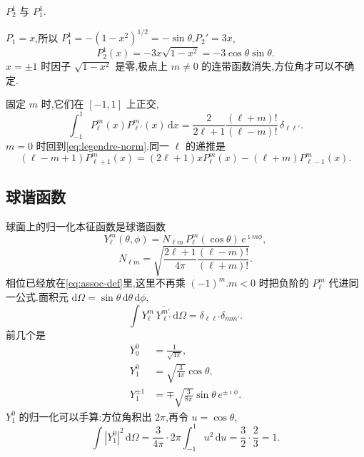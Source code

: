 \begin{example}
$P_2^{1}$ 与 $P_1^{1}$.
\end{example}
\begin{solution}
$P_1=x$,所以 $P_1^{1}=-(1-x^2)^{1/2}=-\sin\theta$.$P_2' =3x$,
\begin{equation}
  P_2^{1}(x)=-3x\sqrt{1-x^2}=-3\cos\theta\sin\theta.
\end{equation}
$x=\pm 1$ 时因子 $\sqrt{1-x^2}$ 是零,极点上 $m\neq 0$ 的连带函数消失,方位角才可以不确定.
\end{solution}

固定 $m$ 时,它们在 $[-1,1]$ 上正交,
\begin{equation}
  \int_{-1}^{1} P_{\ell}^{m}(x)P_{\ell'}^{m}(x)\,\mathrm{d}x
  =\frac{2}{2\ell+1}\frac{(\ell+m)!}{(\ell-m)!}\,\delta_{\ell\ell'}.
  \label{eq:assoc-norm}
\end{equation}
$m=0$ 时回到\eqref{eq:legendre-norm}.同一 $\ell$ 的递推是
\begin{equation}
  (\ell-m+1)P_{\ell+1}^{m}(x)
  =(2\ell+1)x P_{\ell}^{m}(x)
  -(\ell+m)P_{\ell-1}^{m}(x).
\end{equation}

\subsection{球谐函数}
球面上的归一化本征函数是球谐函数
\begin{equation}
  Y_{\ell}^{m}(\theta,\phi)
  =N_{\ell m}\, P_{\ell}^{m}(\cos\theta)\, e^{\imath m\phi},
  \label{eq:spherical-harmonic}
\end{equation}
\begin{equation}
  N_{\ell m}
  =\sqrt{\frac{2\ell+1}{4\pi}\frac{(\ell-m)!}{(\ell+m)!}}.
\end{equation}
相位已经放在\eqref{eq:assoc-def}里,这里不再乘 $(-1)^{m}$.$m<0$ 时把负阶的 $P_{\ell}^{m}$ 代进同一公式.面积元 $\mathrm{d}\Omega=\sin\theta\,\mathrm{d}\theta\,\mathrm{d}\phi$,
\begin{equation}
  \int Y_{\ell}^{m}\,\overline{Y_{\ell'}^{m'}}\,\mathrm{d}\Omega
  =\delta_{\ell\ell'}\delta_{mm'}.
\end{equation}
前几个是
\begin{align}
  Y_0^{0}&=\frac{1}{\sqrt{4\pi}}, \\
  Y_1^{0}&=\sqrt{\frac{3}{4\pi}}\cos\theta, \\
  Y_1^{\pm 1}&=\mp\sqrt{\frac{3}{8\pi}}\sin\theta\, e^{\pm\imath\phi}.
\end{align}
$Y_1^{0}$ 的归一化可以手算:方位角积出 $2\pi$,再令 $u=\cos\theta$,
\begin{equation}
  \int |Y_1^{0}|^2\,\mathrm{d}\Omega
  =\frac{3}{4\pi}\cdot 2\pi\int_{-1}^{1} u^2\,\mathrm{d}u
  =\frac{3}{2}\cdot\frac{2}{3}=1.
\end{equation}

